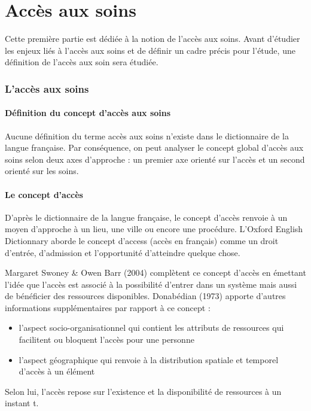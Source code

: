 \chapter{Accès aux soins}

Cette première partie est dédiée à la notion de l'accès aux soins. Avant d'étudier les enjeux liés à l'accès aux soins et de définir un cadre précis pour l'étude, une définition de l'accès aux soin sera étudiée. 


\subsection{L'accès aux soins}
\subsubsection{Définition du concept \og d'accès aux soins\fg}
Aucune définition du terme \og accès aux soins \fg{} n'existe dans le dictionnaire de la langue française. Par conséquence, on peut analyser le concept global d'accès aux soins selon deux axes d'approche : un premier axe orienté sur l'accès et un second orienté sur les soins.

\subsubsection{Le concept d'accès} 

D'après le dictionnaire de la langue française, le concept \og d'accès\fg{} renvoie à un moyen d'approche à un lieu, une ville ou encore une procédure. L'Oxford English Dictionnary \cite{oxforddictionnary} aborde le concept d'\og access \fg (\og accès\fg{}  en français) comme un droit d'entrée, d'admission et l'opportunité d'atteindre quelque chose.

Margaret Swoney \& Owen Barr (2004) \cite{SwoneyBarr2004} complètent ce concept d'accès en émettant l'idée que l'accès est associé à la possibilité d'entrer dans un système mais aussi de bénéficier des ressources disponibles.
Donabédian (1973) \cite{Donabedian1973} apporte d'autres informations supplémentaires par rapport à  ce concept : 
\begin{itemize}
\item l'aspect socio-organisationnel qui contient les attributs de ressources qui facilitent ou bloquent l'accès pour une personne
\item l'aspect géographique qui renvoie à la distribution spatiale et temporel d'accès à un élément
\end{itemize}
Selon lui, l'accès repose sur l'existence et la disponibilité de ressources à un instant t.

